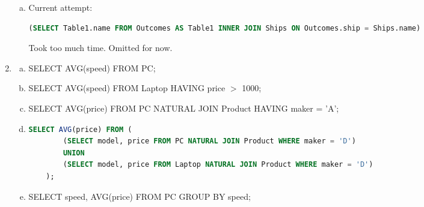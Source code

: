 \documentclass[12pt]{article}
\begin{document}
\begin{enumerate}[1.]
\begin{enumerate}[a)]
    \item

    Current attempt:

    \begin{lstlisting}[language=SQL]
    (SELECT Table1.name FROM Outcomes AS Table1 INNER JOIN Ships ON Outcomes.ship = Ships.name)
    \end{lstlisting}

    Took too much time. Omitted for now.

    \end{enumerate}

    \item

    \begin{enumerate}[a)]
        \item SELECT AVG(speed) FROM PC;
        \item SELECT AVG(speed) FROM Laptop HAVING price $>$ 1000;
        \item SELECT AVG(price) FROM PC NATURAL JOIN Product HAVING maker = 'A';
        \item

    \begin{lstlisting}[language=SQL]
    SELECT AVG(price) FROM (
        (SELECT model, price FROM PC NATURAL JOIN Product WHERE maker = 'D')
        UNION
        (SELECT model, price FROM Laptop NATURAL JOIN Product WHERE maker = 'D')
    );
    \end{lstlisting}
        \item   SELECT speed, AVG(price) FROM PC GROUP BY speed;


    \end{enumerate}
\end{enumerate}
\end{document}
